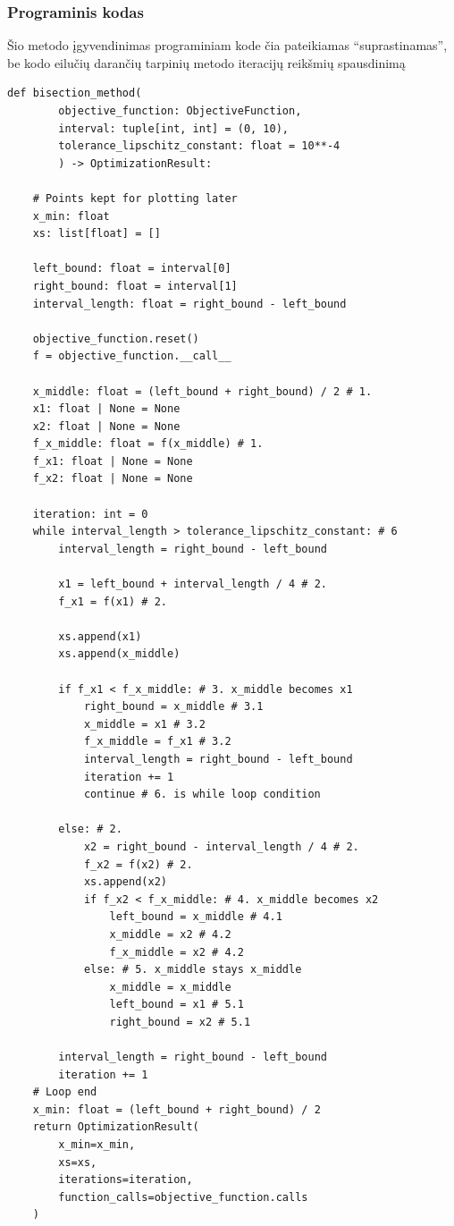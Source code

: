 \documentclass[lithuanian,a4paper,12pt]{article}
\begin{document}
\pagebreak
\subsubsection*{Programinis kodas}
Šio metodo įgyvendinimas programiniam kode čia pateikiamas ``suprastinamas'', be kodo eilučių darančių tarpinių metodo iteracijų reikšmių spausdinimą

\begin{verbatim}
def bisection_method(
        objective_function: ObjectiveFunction, 
        interval: tuple[int, int] = (0, 10), 
        tolerance_lipschitz_constant: float = 10**-4
        ) -> OptimizationResult:
    
    # Points kept for plotting later
    x_min: float
    xs: list[float] = []
    
    left_bound: float = interval[0]
    right_bound: float = interval[1]
    interval_length: float = right_bound - left_bound

    objective_function.reset()
    f = objective_function.__call__

    x_middle: float = (left_bound + right_bound) / 2 # 1.
    x1: float | None = None
    x2: float | None = None
    f_x_middle: float = f(x_middle) # 1.
    f_x1: float | None = None
    f_x2: float | None = None

    iteration: int = 0
    while interval_length > tolerance_lipschitz_constant: # 6
        interval_length = right_bound - left_bound
            
        x1 = left_bound + interval_length / 4 # 2.
        f_x1 = f(x1) # 2.

        xs.append(x1)
        xs.append(x_middle)
        
        if f_x1 < f_x_middle: # 3. x_middle becomes x1
            right_bound = x_middle # 3.1
            x_middle = x1 # 3.2
            f_x_middle = f_x1 # 3.2
            interval_length = right_bound - left_bound
            iteration += 1
            continue # 6. is while loop condition

        else: # 2.
            x2 = right_bound - interval_length / 4 # 2.
            f_x2 = f(x2) # 2.
            xs.append(x2)
            if f_x2 < f_x_middle: # 4. x_middle becomes x2
                left_bound = x_middle # 4.1 
                x_middle = x2 # 4.2 
                f_x_middle = x2 # 4.2
            else: # 5. x_middle stays x_middle
                x_middle = x_middle
                left_bound = x1 # 5.1 
                right_bound = x2 # 5.1

        interval_length = right_bound - left_bound
        iteration += 1
    # Loop end
    x_min: float = (left_bound + right_bound) / 2
    return OptimizationResult(
        x_min=x_min, 
        xs=xs, 
        iterations=iteration, 
        function_calls=objective_function.calls
    )
\end{verbatim}
\end{document}
